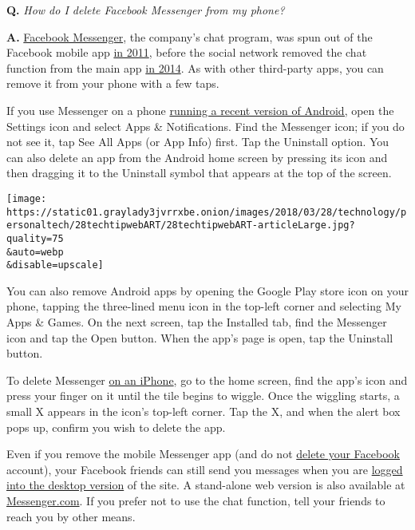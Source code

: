 \textbf{Q.} \emph{How do I delete Facebook Messenger from my phone?}

\textbf{A.} \href{https://www.messenger.com/features}{Facebook
Messenger}, the company's chat program, was spun out of the Facebook
mobile app
\href{https://www.facebookcorewwwi.onion/notes/facebook-engineering/building-facebook-messenger/10150259350998920/}{in
2011}, before the social network removed the chat function from the main
app
\href{https://bits.blogs.nytimes3xbfgragh.onion/2014/04/15/facebook-forces-users-to-install-separate-messaging-app/}{in
2014}. As with other third-party apps, you can remove it from your phone
with a few taps.

If you use Messenger on a phone
\href{https://support.google.com/googleplay/answer/2521768?hl=en}{running
a recent version of Android,} open the Settings icon and select Apps \&
Notifications. Find the Messenger icon; if you do not see it, tap See
All Apps (or App Info) first. Tap the Uninstall option. You can also
delete an app from the Android home screen by pressing its icon and then
dragging it to the Uninstall symbol that appears at the top of the
screen.

\texttt{[image: https://static01.graylady3jvrrxbe.onion/images/2018/03/28/technology/personaltech/28techtipwebART/28techtipwebART-articleLarge.jpg?quality=75\\\&auto=webp\\\&disable=upscale]}

You can also remove Android apps by opening the Google Play store icon
on your phone, tapping the three-lined menu icon in the top-left corner
and selecting My Apps \& Games. On the next screen, tap the Installed
tab, find the Messenger icon and tap the Open button. When the app's
page is open, tap the Uninstall button.

To delete Messenger \href{https://support.apple.com/en-us/HT207618}{on
an iPhone}, go to the home screen, find the app's icon and press your
finger on it until the tile begins to wiggle. Once the wiggling starts,
a small X appears in the icon's top-left corner. Tap the X, and when the
alert box pops up, confirm you wish to delete the app.

Even if you remove the mobile Messenger app (and do not
\href{https://www.nytimes3xbfgragh.onion/2018/03/21/technology/personaltech/delete-facebook.html}{delete
your Facebook} account), your Facebook friends can still send you
messages when you are
\href{https://www.facebookcorewwwi.onion/help/735006619902401}{logged
into the desktop version} of the site. A stand-alone web version is also
available at \href{https://www.messenger.com}{Messenger.com}. If you
prefer not to use the chat function, tell your friends to reach you by
other means.

